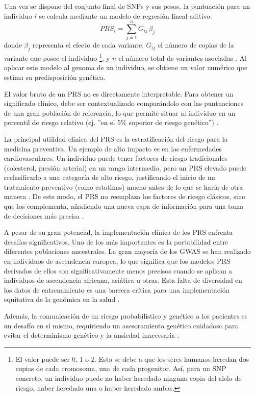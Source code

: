 Una vez se dispone del conjunto final de SNPs y sus pesos, la puntuación para un individuo $i$ se calcula mediante un modelo de regresión lineal aditivo:
$$PRS_i = \sum_{j=1}^{n}  G_{ij} \, \beta_j$$ donde $\beta_j$ representa el efecto de cada variante, $G_{ij}$ el número de copias de la variante que posee el individuo \footnote{El valor puede ser 0, 1 o 2. Esto se debe a que los seres humanos heredan dos copias de cada cromosoma, una de cada progenitor. Así, para un SNP concreto, un individuo puede no haber heredado ninguna copia del alelo de riesgo, haber heredado una o haber heredado ambas.}, y $n$ el número total de variantes asociadas \cite{choi, collister}. Al aplicar este modelo al genoma de un individuo, se obtiene un valor numérico que estima su predisposición genética.

El valor bruto de un PRS no es directamente interpretable. Para obtener un significado clínico, debe ser contextualizado comparándolo con las puntuaciones de una gran población de referencia, lo que permite situar al individuo en un percentil de riesgo relativo (ej. ''en el 5\% superior de riesgo genético'') \cite{maamari, corpas}.

La principal utilidad clínica del PRS es la estratificación del riesgo para la medicina preventiva. Un ejemplo de alto impacto es en las enfermedades cardiovasculares. Un individuo puede tener factores de riesgo tradicionales (colesterol, presión arterial) en un rango intermedio, pero un PRS elevado puede reclasificarlo a una categoría de alto riesgo, justificando el inicio de un tratamiento preventivo (como estatinas) mucho antes de lo que se haría de otra manera \cite{knowles}. De este modo, el PRS no reemplaza los factores de riesgo clásicos, sino que los complementa, añadiendo una nueva capa de información para una toma de decisiones más precisa \cite{terkelsen}.

A pesar de su gran potencial, la implementación clínica de los PRS enfrenta desafíos significativos. Uno de los más importantes es la portabilidad entre diferentes poblaciones ancestrales. La gran mayoría de los GWAS se han realizado en individuos de ascendencia europea, lo que significa que los modelos PRS derivados de ellos son significativamente menos precisos cuando se aplican a individuos de ascendencia africana, asiática u otras. Esta falta de diversidad en los datos de entrenamiento es una barrera crítica para una implementación equitativa de la genómica en la salud \cite{torkamani2018}.

Además, la comunicación de un riesgo probabilístico y genético a los pacientes es un desafío en sí mismo, requiriendo un asesoramiento genético cuidadoso para evitar el determinismo genético y la ansiedad innecesaria \cite{alliance}. 

